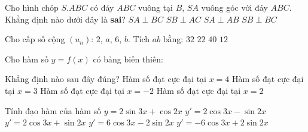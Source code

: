 		\begin{ex}%
			Cho hình chóp $S.ABC$ có đáy $ABC$ vuông tại $B$, $SA$ vuông góc với đáy $ABC$. Khẳng định nào dưới đây là \textbf{sai}?
			\choice
			{$SA\perp BC$}
			{\True $SB\perp AC$}
			{$SA\perp AB$}
			{$SB\perp BC$}
		\end{ex}
		
		\begin{ex}%
			Cho cấp số cộng $(u_n)$: $2$, $a$, $6$, $b$. Tích $ab$ bằng:
			\choice
			{\True $32$}
			{$22$}
			{$40$}
			{$12$}
		\end{ex}
		
		\begin{ex}%
			Cho hàm số $y=f(x)$ có bảng biến thiên:
			\begin{center}
			\end{center}
			Khẳng định nào sau đây đúng?
			\choice
			{Hàm số đạt cực đại tại $x=4$}
			{Hàm số đạt cực đại tại $x=3$}
			{Hàm số đạt cực đại tại $x=-2$}
			{\True Hàm số đạt cực đại tại $x=2$}
		\end{ex}
		
		\begin{ex}%
			Tính đạo hàm của hàm số $y=2\sin 3x+\cos 2x$
			\choice
			{$y'=2\cos 3x-\sin 2x$}
			{$y'=2\cos 3x+\sin 2x$}
			{\True $y'=6\cos 3x-2\sin 2x$}
			{$y'=-6\cos 3x+2\sin 2x$}
		\end{ex}
		
